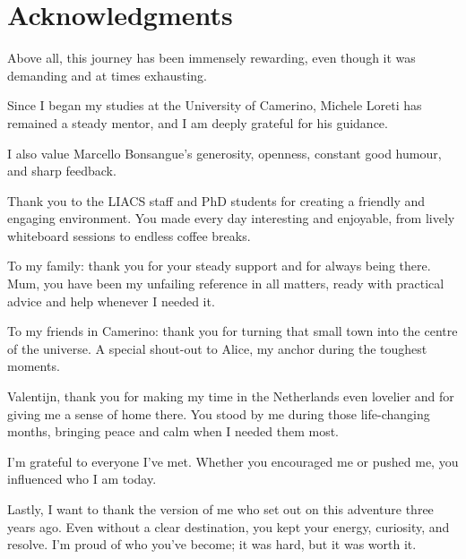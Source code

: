 \chapter*{Acknowledgments}

Above all, this journey has been immensely rewarding, even though it was demanding and at times exhausting.

Since I began my studies at the University of Camerino, Michele Loreti has remained a steady mentor, and I am deeply grateful for his guidance.

I also value Marcello Bonsangue's generosity, openness, constant good humour, and sharp feedback.

Thank you to the LIACS staff and PhD students for creating a friendly and engaging environment. You made every day interesting and enjoyable, from lively whiteboard sessions to endless coffee breaks.

To my family: thank you for your steady support and for always being there. Mum, you have been my unfailing reference in all matters, ready with practical advice and help whenever I needed it.

To my friends in Camerino: thank you for turning that small town into the centre of the universe. A special shout-out to Alice, my anchor during the toughest moments.

Valentijn, thank you for making my time in the Netherlands even lovelier and for giving me a sense of home there. You stood by me during those life-changing months, bringing peace and calm when I needed them most.

I'm grateful to everyone I've met. Whether you encouraged me or pushed me, you influenced who I am today.

Lastly, I want to thank the version of me who set out on this adventure three years ago. Even without a clear destination, you kept your energy, curiosity, and resolve. I'm proud of who you've become; it was hard, but it was worth it.